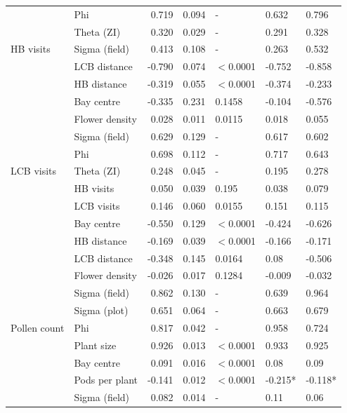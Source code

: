 \documentclass[12pt]{article} %
\begin{document}
\begin{longtable}{l|l|r|r|l|l|l}
\cline{2-7}
 & Phi & 0.719 & 0.094 & - & 0.632 & 0.796\\
\cline{2-7}
 & Theta (ZI) & 0.320 & 0.029 & - & 0.291 & 0.328\\
\cline{2-7}
\multirow{-7}{*}{\raggedright\arraybackslash HB visits} & Sigma (field) & 0.413 & 0.108 & - & 0.263 & 0.532\\
\cline{1-7}
 & LCB distance & -0.790 & 0.074 & $<$0.0001 & -0.752 & -0.858\\
\cline{2-7}
 & HB distance & -0.319 & 0.055 & $<$0.0001 & -0.374 & -0.233\\
\cline{2-7}
 & Bay centre & -0.335 & 0.231 & 0.1458 & -0.104 & -0.576\\
\cline{2-7}
 & Flower density & 0.028 & 0.011 & 0.0115 & 0.018 & 0.055\\
\cline{2-7}
 & Sigma (field) & 0.629 & 0.129 & - & 0.617 & 0.602\\
\cline{2-7}
 & Phi & 0.698 & 0.112 & - & 0.717 & 0.643\\
\cline{2-7}
\multirow{-7}{*}{\raggedright\arraybackslash LCB visits} & Theta (ZI) & 0.248 & 0.045 & - & 0.195 & 0.278\\
\cline{1-7}
 & HB visits & 0.050 & 0.039 & 0.195 & 0.038 & 0.079\\
\cline{2-7}
 & LCB visits & 0.146 & 0.060 & 0.0155 & 0.151 & 0.115\\
\cline{2-7}
 & Bay centre & -0.550 & 0.129 & $<$0.0001 & -0.424 & -0.626\\
\cline{2-7}
 & HB distance & -0.169 & 0.039 & $<$0.0001 & -0.166 & -0.171\\
\cline{2-7}
 & LCB distance & -0.348 & 0.145 & 0.0164 & 0.08 & -0.506\\
\cline{2-7}
 & Flower density & -0.026 & 0.017 & 0.1284 & -0.009 & -0.032\\
\cline{2-7}
 & Sigma (field) & 0.862 & 0.130 & - & 0.639 & 0.964\\
\cline{2-7}
 & Sigma (plot) & 0.651 & 0.064 & - & 0.663 & 0.679\\
\cline{2-7}
\multirow{-9}{*}{\raggedright\arraybackslash Pollen count} & Phi & 0.817 & 0.042 & - & 0.958 & 0.724\\
\cline{1-7}
 & Plant size & 0.926 & 0.013 & $<$0.0001 & 0.933 & 0.925\\
\cline{2-7}
 & Bay centre & 0.091 & 0.016 & $<$0.0001 & 0.08 & 0.09\\
\cline{2-7}
 & Pods per plant & -0.141 & 0.012 & $<$0.0001 & -0.215* & -0.118*\\
\cline{2-7}
 & Sigma (field) & 0.082 & 0.014 & - & 0.11 & 0.06\\

\end{longtable}
\end{document}
